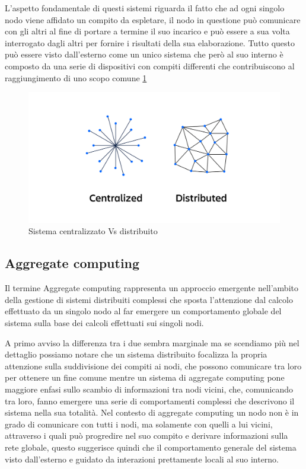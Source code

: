 \documentclass[12pt,a4paper,openright,twoside]{book}
\begin{document}
L'aspetto fondamentale di questi sistemi riguarda il fatto che ad ogni singolo \gls{nodo} viene affidato un compito da espletare, il nodo in questione può comunicare con gli altri al fine di portare a termine il suo incarico e può essere a sua volta interrogato dagli altri per fornire i risultati della sua elaborazione.
Tutto questo può essere visto dall'esterno come un unico sistema che però al suo interno è composto da una serie di dispositivi con compiti differenti che contribuiscono al raggiungimento di uno scopo comune \ref{fig:centralizedVsDistributed}
\begin{figure}[h!]
	\centering
	\includegraphics[width=0.8\linewidth]{figures/centralizedVsDistributed.png}
	\caption{Sistema centralizzato Vs distribuito \cite{centralizedVsDistributed}}
	\label{fig:centralizedVsDistributed}
\end{figure}

\subsection{Aggregate computing}
Il termine Aggregate computing rappresenta un approccio emergente nell'ambito della gestione di sistemi distribuiti complessi \cite{VIROLI2019100486} che sposta l'attenzione dal calcolo effettuato da un singolo nodo al far emergere un comportamento globale del sistema sulla base dei calcoli effettuati sui singoli nodi.

A primo avviso la differenza tra i due sembra marginale ma se scendiamo più nel dettaglio possiamo notare che un sistema distribuito focalizza la propria attenzione sulla suddivisione dei compiti ai nodi, che possono comunicare tra loro per ottenere un fine comune mentre un sistema di aggregate computing pone maggiore enfasi sullo scambio di informazioni tra nodi vicini, che, comunicando tra loro, fanno emergere una serie di comportamenti complessi che descrivono il sistema nella sua totalità.
Nel contesto di aggregate computing un nodo non è in grado di comunicare con tutti i nodi, ma solamente con quelli a lui vicini, attraverso i quali può progredire nel suo compito e derivare informazioni sulla rete globale, questo suggerisce quindi che il comportamento generale del sistema visto dall'esterno e guidato da interazioni prettamente locali al suo interno.
\end{document}
